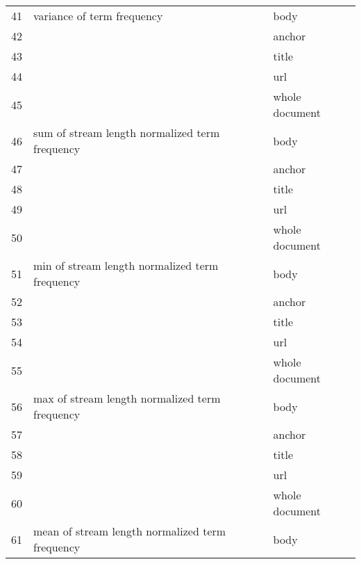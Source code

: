 \begin{longtable}{cll}
\midrule41         & variance of term frequency                          & body           \\
42         &                                                     & anchor         \\
43         &                                                     & title          \\
44         &                                                     & url            \\
45         &                                                     & whole document \\
\midrule46         & sum of stream length normalized term frequency      & body           \\
47         &                                                     & anchor         \\
48         &                                                     & title          \\
49         &                                                     & url            \\
50         &                                                     & whole document \\
\midrule51         & min of stream length normalized term frequency      & body           \\
52         &                                                     & anchor         \\
53         &                                                     & title          \\
54         &                                                     & url            \\
55         &                                                     & whole document \\
\midrule56         & max of stream length normalized term frequency      & body           \\
57         &                                                     & anchor         \\
58         &                                                     & title          \\
59         &                                                     & url            \\
60         &                                                     & whole document \\
\midrule61         & mean of stream length normalized term frequency     & body           \\

\end{longtable}
